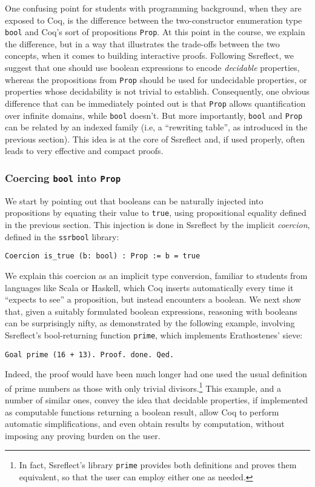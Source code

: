 \documentclass[blockstyle,preprint]{sigplanconf}
\newcommand{\code}[1]{\lstinline{#1}}
\begin{document}
One confusing point for students with programming background, when
they are exposed to Coq, is the difference between the two-constructor
enumeration type \code{bool} and Coq's sort of propositions
\code{Prop}. At this point in the course, we explain the difference,
but in a way that illustrates the trade-offs between the two concepts,
when it comes to building interactive proofs. Following Ssreflect, we
suggest that one should use boolean expressions to encode
\emph{decidable} properties, whereas the propositions from \code{Prop}
should be used for undecidable properties, or properties whose
decidability is not trivial to establish. Consequently, one obvious
difference that can be immediately pointed out is that \code{Prop}
allows quantification over infinite domains, while \code{bool}
doesn't. But more importantly, \code{bool} and \code{Prop} can be
related by an indexed family (i.e, a ``rewriting table'', as
introduced in the previous section). This idea is at the core of
Ssreflect and, if used properly, often leads to very effective and
compact proofs.

\subsubsection{Coercing \code{bool} into \code{Prop}}
\label{sec:coerc-codeb-into}
We start by pointing out that booleans can be naturally injected into
propositions by equating their value to \code{true}, using
propositional equality defined in the previous section. This injection
is done in Ssreflect by the implicit \emph{coercion}, defined in the
\code{ssrbool} library:
%
\begin{lstlisting}
Coercion is_true (b: bool) : Prop := b = true
\end{lstlisting}

We explain this coercion as an implicit type conversion, familiar to
students from languages like Scala or Haskell, which Coq inserts
automatically every time it ``expects to see'' a proposition, but
instead encounters a boolean. We next show that, given a suitably
formulated boolean expressions, reasoning with booleans can be
surprisingly nifty, as demonstrated by the following example,
involving Ssreflect's bool-returning function \code{prime}, which
implements Erathostenes' sieve:
%
\begin{lstlisting}
Goal prime (16 + 13). Proof. done. Qed.
\end{lstlisting}
%
Indeed, the proof would have been much longer had one used the usual
definition of prime numbers as those with only trivial
divisors.\footnote{In fact, Ssreflect's library \code{prime} provides
  both definitions and proves them equivalent, so that the user can
  employ either one as needed.}
%
This example, and a number of similar ones, convey the idea that
decidable properties, if implemented as computable functions returning
a boolean result, allow Coq to perform automatic simplifications, and
even obtain results by computation, without imposing any proving
burden on the user.
\end{document}
